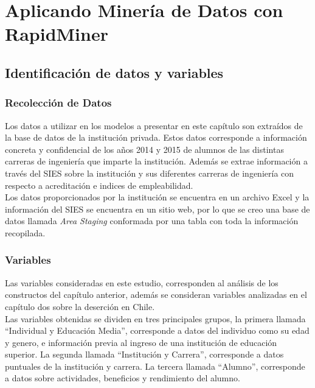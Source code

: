 \chapter[Aplicando Minería de Datos con RapidMiner]{Aplicando Minería de Datos con RapidMiner}
\label{ch:desmin}

\section{Identificación de datos y variables}
\subsection{Recolección de Datos}

Los datos a utilizar en los modelos a presentar en este capítulo son extraídos de la base de datos de la institución privada. Estos datos corresponde a información concreta y confidencial de los años 2014 y 2015 de alumnos de las distintas carreras de ingeniería que imparte la institución. Además se extrae información a través del SIES sobre la institución y sus diferentes carreras de ingeniería con respecto a acreditación e indices de empleabilidad.\\

Los datos proporcionados por la institución se encuentra en un archivo Excel y la información del SIES se encuentra en un sitio web, por lo que se creo una base de datos llamada \textit{Area Staging} conformada por una tabla con toda la información recopilada.\\ 

\subsection{Variables}

Las variables consideradas en este estudio, corresponden al análisis de los constructos del capítulo anterior, además se consideran variables analizadas en el capítulo dos sobre la deserción en Chile.\\

Las variables obtenidas se dividen en tres principales grupos, la primera llamada ``Individual y Educación Media'', corresponde a datos del individuo como su edad y genero, e información previa al ingreso de una institución de educación superior. La segunda llamada ``Institución y Carrera'', corresponde a datos puntuales de la institución y carrera. La tercera llamada ``Alumno'', corresponde a datos sobre actividades, beneficios y rendimiento del alumno.\\



